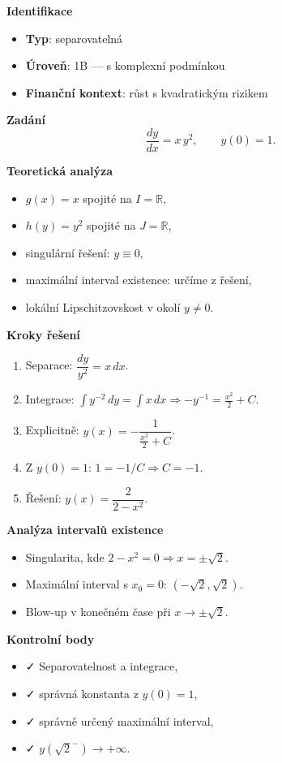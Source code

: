 \begin{example}
\label{ex:1b1}

\textbf{Identifikace}
\begin{itemize}
\item \textbf{Typ}: separovatelná
\item \textbf{Úroveň}: 1B — s komplexní podmínkou
\item \textbf{Finanční kontext}: růst s kvadratickým rizikem
\end{itemize}

\textbf{Zadání}
\[
\frac{dy}{dx} = x\, y^2, \qquad y(0) = 1.
\]

\textbf{Teoretická analýza}
\begin{itemize}
\item $g(x) = x$ spojité na $I=\mathbb{R}$,
\item $h(y)=y^2$ spojité na $J=\mathbb{R}$,
\item singulární řešení: $y\equiv 0$,
\item maximální interval existence: určíme z řešení,
\item lokální Lipschitzovskost v okolí $y\neq 0$.
\end{itemize}

\textbf{Kroky řešení}
\begin{enumerate}
\item Separace: $\dfrac{dy}{y^2} = x\,dx$.
\item Integrace: $\int y^{-2}\,dy = \int x\,dx \Rightarrow -y^{-1} = \tfrac{x^2}{2} + C$.
\item Explicitně: $y(x) = -\dfrac{1}{\frac{x^2}{2}+C}$.
\item Z $y(0)=1$: $1 = -1/C \Rightarrow C=-1$.
\item Řešení: $y(x)=\dfrac{2}{2-x^2}$.
\end{enumerate}

\textbf{Analýza intervalů existence}
\begin{itemize}
\item Singularita, kde $2-x^2=0 \Rightarrow x=\pm\sqrt{2}$.
\item Maximální interval s $x_0=0$: $(-\sqrt{2},\sqrt{2})$.
\item Blow-up v konečném čase při $x\to \pm\sqrt{2}$.
\end{itemize}

\textbf{Kontrolní body}
\begin{itemize}
\item ✓ Separovatelnost a integrace,
\item ✓ správná konstanta z $y(0)=1$,
\item ✓ správně určený maximální interval,
\item ✓ $y(\sqrt{2}^{-})\to +\infty$.
\end{itemize}


\end{example}
